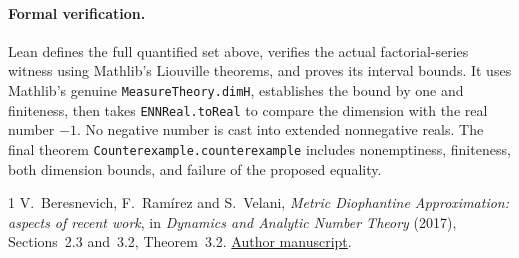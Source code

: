 \documentclass[11pt]{article}
\begin{document}
\paragraph{Formal verification.}
Lean defines the full quantified set above, verifies the actual factorial-series witness using Mathlib's Liouville theorems, and proves its interval bounds. It uses Mathlib's genuine \texttt{MeasureTheory.dimH}, establishes the bound by one and finiteness, then takes \texttt{ENNReal.toReal} to compare the dimension with the real number $-1$. No negative number is cast into extended nonnegative reals. The final theorem \texttt{Counterexample.counterexample} includes nonemptiness, finiteness, both dimension bounds, and failure of the proposed equality.

\begin{thebibliography}{1}
 V.~Beresnevich, F.~Ram\'irez and S.~Velani, \emph{Metric Diophantine Approximation: aspects of recent work}, in \emph{Dynamics and Analytic Number Theory} (2017), Sections~2.3 and~3.2, Theorem~3.2. \href{https://eprints.whiterose.ac.uk/id/eprint/113590/}{Author manuscript}.
\end{thebibliography}
\end{document}
